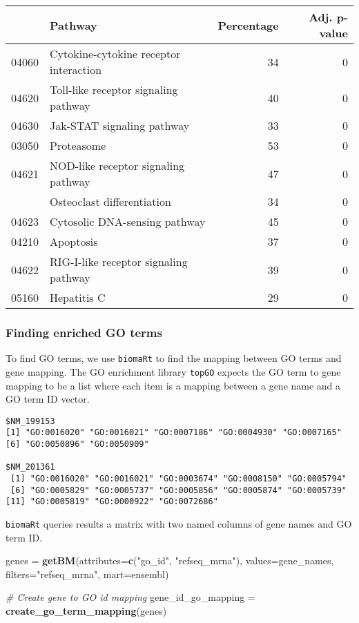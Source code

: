 \documentclass[9pt,a4paper,]{extarticle}
\newenvironment{Shaded}{\begin{snugshade}}{\end{snugshade}}
\newcommand{\CommentTok}[1]{\textcolor[rgb]{0.56,0.35,0.01}{\textit{#1}}}
\newcommand{\DataTypeTok}[1]{\textcolor[rgb]{0.13,0.29,0.53}{#1}}
\newcommand{\KeywordTok}[1]{\textcolor[rgb]{0.13,0.29,0.53}{\textbf{#1}}}
\newcommand{\NormalTok}[1]{#1}
\newcommand{\StringTok}[1]{\textcolor[rgb]{0.31,0.60,0.02}{#1}}
\begin{document}
\begin{tabular}{llrr}
\toprule
  & Pathway & Percentage & Adj. p-value\\
\midrule
04060 & Cytokine-cytokine receptor interaction & 34 & 0\\
04620 & Toll-like receptor signaling pathway & 40 & 0\\
04630 & Jak-STAT signaling pathway & 33 & 0\\
03050 & Proteasome & 53 & 0\\
04621 & NOD-like receptor signaling pathway & 47 & 0\\
\addlinespace
04380 & Osteoclast differentiation & 34 & 0\\
04623 & Cytosolic DNA-sensing pathway & 45 & 0\\
04210 & Apoptosis & 37 & 0\\
04622 & RIG-I-like receptor signaling pathway & 39 & 0\\
05160 & Hepatitis C & 29 & 0\\
\bottomrule
\end{tabular}

\hypertarget{finding-enriched-go-terms}{%
\subsubsection{Finding enriched GO terms}\label{finding-enriched-go-terms}}

To find GO terms, we use \texttt{biomaRt} to find the mapping between GO terms and
gene mapping. The GO enrichment library \texttt{topGO} \citep{alexa:topgo} expects the GO term to gene
mapping to be a list where each item is a mapping between a gene name and a GO
term ID vector.

\begin{verbatim}
$NM_199153
[1] "GO:0016020" "GO:0016021" "GO:0007186" "GO:0004930" "GO:0007165"
[6] "GO:0050896" "GO:0050909"

$NM_201361
 [1] "GO:0016020" "GO:0016021" "GO:0003674" "GO:0008150" "GO:0005794"
 [6] "GO:0005829" "GO:0005737" "GO:0005856" "GO:0005874" "GO:0005739"
[11] "GO:0005819" "GO:0000922" "GO:0072686"
\end{verbatim}

\texttt{biomaRt} queries results a matrix with two named columns of gene names and GO
term ID.

\begin{Shaded}
\begin{Highlighting}[]
\NormalTok{genes =}\StringTok{ }\KeywordTok{getBM}\NormalTok{(}\DataTypeTok{attributes=}\KeywordTok{c}\NormalTok{(}\StringTok{"go_id"}\NormalTok{, }\StringTok{"refseq_mrna"}\NormalTok{),}
          \DataTypeTok{values=}\NormalTok{gene_names,}
          \DataTypeTok{filters=}\StringTok{"refseq_mrna"}\NormalTok{,}
          \DataTypeTok{mart=}\NormalTok{ensembl)}

\CommentTok{# Create gene to GO id mapping}
\NormalTok{gene_id_go_mapping =}\StringTok{ }\KeywordTok{create_go_term_mapping}\NormalTok{(genes)}
\end{Highlighting}
\end{Shaded}
\end{document}
